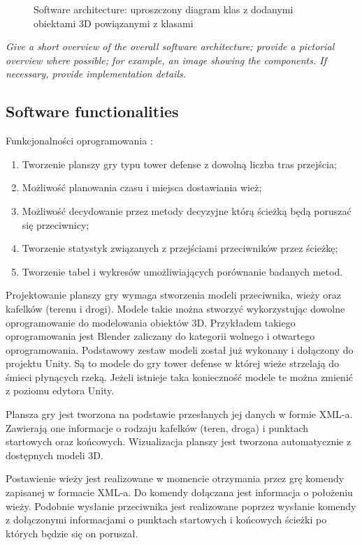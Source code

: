 \begin{figure}

\caption{Software architecture: uproszczony diagram klas z dodanymi obiektami 3D powiązanymi z klasami}
\label{Fig:softwareArchitecture}
\end{figure}



\textit{  Give a short overview of the overall software architecture; provide a pictorial overview where possible; for example, an image showing the components. If necessary, provide implementation details.}

 \subsection{Software functionalities}
 
 Funkcjonalności oprogramowania \SoftwareName:
 \begin{enumerate}
  \item Tworzenie planszy gry typu tower defense z dowolną liczba tras przejścia;
  \item Możliwość planowania czasu i miejsca dostawiania wież;
  \item Możliwość decydowanie przez metody decyzyjne którą ścieżką będą poruszać się przeciwnicy;
  \item Tworzenie statystyk związanych z przejściami przeciwników przez ścieżkę;
  \item Tworzenie tabel i wykresów umożliwiających porównanie badanych metod.
\end{enumerate}

Projektowanie planszy gry wymaga stworzenia modeli przeciwnika, wieży oraz kafelków (terenu i drogi). Modele takie można stworzyć wykorzystując dowolne oprogramowanie do modelowania obiektów 3D. Przykładem  takiego oprogramowania jest Blender zaliczany do kategorii wolnego i otwartego oprogramowania. Podstawowy zestaw modeli został już wykonany i dołączony do projektu Unity. Są to modele do gry tower defense w której wieże strzelają do śmieci płynących rzeką. Jeżeli istnieje taka konieczność modele te można zmienić z poziomu edytora Unity. 
 
Plansza gry jest tworzona na podstawie przesłanych jej danych w formie XML-a. Zawierają one informacje o rodzaju kafelków (teren, droga) i punktach startowych oraz końcowych. Wizualizacja planszy jest tworzona automatycznie z dostępnych modeli 3D.

Postawienie wieży jest realizowane w momencie otrzymania przez grę komendy zapisanej w formacie XML-a. Do komendy dołączana jest informacja o położeniu wieży. Podobnie wysłanie przeciwnika jest realizowane poprzez wysłanie komendy z dołączonymi informacjami o punktach startowych i końcowych ścieżki po których będzie się on poruszał.

